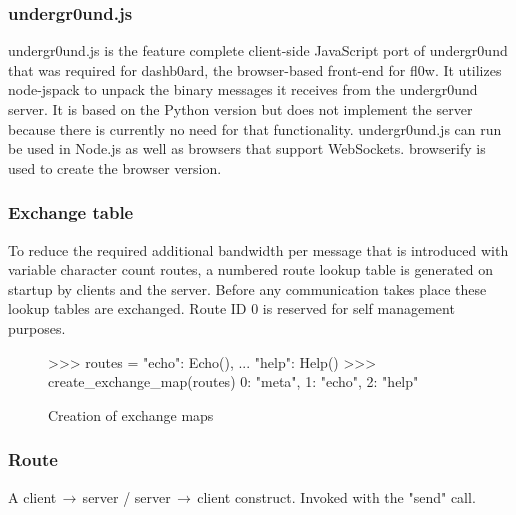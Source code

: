 \documentclass[conference]{IEEEtran}
\begin{document}
\subsubsection{undergr0und.js}
undergr0und.js\cite{undergr0und.js:Philip Trauner} is the feature complete client-side JavaScript port of undergr0und\cite{undergr0und:Philip Trauner} that was required for dashb0ard\cite{dashb0ard:Sebastian Schaffler}, the browser-based front-end for fl0w\cite{fl0w:Philip Trauner}. It utilizes node-jspack\cite{node-jspack:Peter Griess} to unpack the binary messages it receives from the undergr0und\cite{undergr0und:Philip Trauner} server. It is based on the Python\cite{Python:Python Foundation} version but does not implement the server because there is currently no need for that functionality. undergr0und.js can run be used in Node.js\cite{Node.js:Node.js Foundation} as well as browsers that support WebSockets\cite{The WebSocket Protocol:A. Melnikov}. browserify\cite{browserify:James Halliday} is used to create the browser version.\\

\subsubsection{Exchange table}
To reduce the required additional bandwidth per message that is introduced with variable character count routes, a numbered route lookup table is generated on startup by clients and the server. Before any communication takes place these lookup tables are exchanged. Route ID 0 is reserved for self management purposes.\\

\begin{figure}[H]
\centering
\begin{python}
>>> routes = {"echo": Echo(),
...    "help": Help()}
>>> create_exchange_map(routes)
{0: "meta", 1: "echo", 2: "help"}
\end{python}
\caption{Creation of exchange maps}
\end{figure}

\subsubsection{Route}
A client$\,\to\,$server / server$\,\to\,$client construct. Invoked with the {\color{deepgreen}"send"} call.
\end{document}
